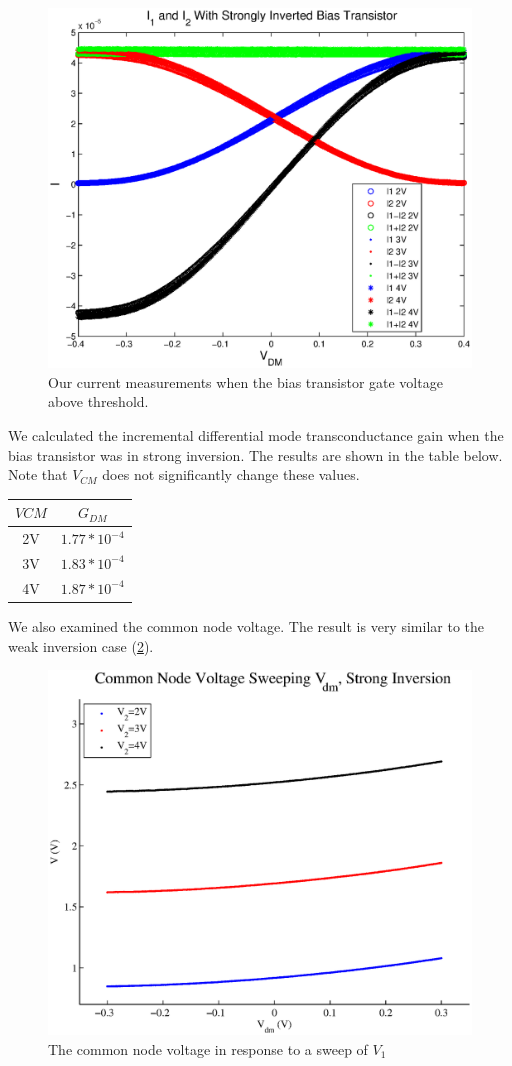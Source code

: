 \documentclass{article}
\begin{document}
\begin{figure}[H]
\centering
\includegraphics[scale=.8]{currents_strong.eps}
\caption{Our current measurements when the bias transistor gate voltage above threshold.}
\label{strong}
\end{figure}

We calculated the incremental differential mode transconductance gain when the bias transistor was in strong inversion. The results are shown in the table below. Note that $V_{CM}$ does not significantly change these values.

\begin{center}
\begin{tabular} {|c|c|}
\hline
$V{CM}$ & $G_{DM}$ \\ 
\hline
2V  & $1.77 *10^{-4}$ \\
3V & $1.83 *10^{-4}$ \\
4V & $1.87 *10^{-4}$ \\
\hline
\end{tabular}
\end{center}

We also examined the common node voltage. The result is very similar to the weak inversion case (\ref{strongV}).

\begin{figure}[H]
\centering
\includegraphics[scale=.7]{plot_strong_v.eps}
\caption{The common node voltage in response to a sweep of $V_1$}
\label{strongV}
\end{figure}
\end{document}
